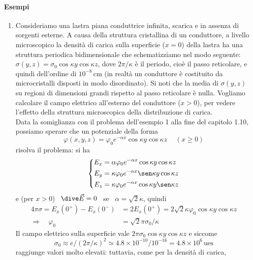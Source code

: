 \paragraph{Esempi}
\begin{enumerate}
  \item Consideriamo una lastra piana conduttrice infinita, scarica e in assenza
    di sorgenti esterne. A causa della struttura cristallina di un conduttore, a
    livello microscopico la densit\`a di carica sulla superficie ($x=0$) della
    lastra ha una struttura periodica bidimensionale che schematizziamo nel modo
    seguente: $\sigma(y,z)=\sigma_0\cos\kappa y\cos\kappa z$, dove $2\pi/\kappa$
    \`e il periodo, cio\`e il passo reticolare, e quindi dell'ordine di
    $10^{-8}$\,cm (in
    realt\`a un conduttore \`e costituito da microcristalli disposti in modo
    disordinato). Si noti che la media di $\sigma(y,z)$ su regioni di dimensioni
    grandi rispetto al passo reticolare \`e nulla. Vogliamo calcolare il campo
    elettrico all'esterno del conduttore ($x>0$), per vedere l'effetto della
    struttura microscopica della distribuzione di carica.\\
    Data la somiglianza con il problema dell'esempio 1 alla fine del capitolo
    1.10, possiamo sperare che un potenziale della forma
    \[
      \varphi(x,y,z)=\varphi_0e^{-\alpha x}\cos\kappa y\cos\kappa z
      \quad\ (x\ge0)
    \]
    risolva il problema: si ha
    \[
      \left\{\begin{aligned}
        E_x&=\alpha\varphi_0e^{-\alpha x}\cos\kappa y\cos\kappa z\\
        E_y&=\kappa\varphi_0e^{-\alpha x}\sen\kappa y\cos\kappa z\\
        E_z&=\kappa\varphi_0e^{-\alpha x}\cos\kappa y\sen\kappa z
      \end{aligned}\right.
    \]
    e (per $x>0$) \ $\dive\vec E=0$ \ se \ $\alpha=\sqrt2\kappa$, quindi
    \[
      \begin{aligned}
        4\pi\sigma=E_x(0^+)-E_x(0^-)
        &=2E_x(0^+)=2\sqrt2\kappa\varphi_0\cos\kappa y\cos\kappa z\\
        \Rightarrow\quad\varphi_0&=\sqrt2\pi\sigma_0/\kappa
      \end{aligned}
    \]
    Il campo elettrico sulla superficie vale
    $2\pi\sigma_0\cos\kappa y\cos\kappa z$ e siccome
    \[
      \sigma_0\approx e/(2\pi/\kappa)^2
      \simeq4.8\times10^{-10}/10^{-16}=4.8\times10^6\,\mathrm{ues}
    \]
    raggiunge valori molto elevati: tuttavia, come per la densit\`a di carica,

\end{enumerate}
